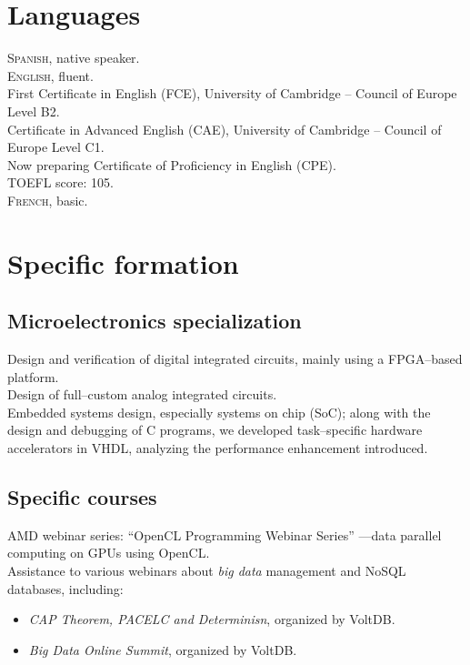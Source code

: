 \documentclass[11pt, a4paper]{article}
\newcommand{\years}[1]{\marginnote{\scriptsize #1}}
\begin{document}
\section*{Languages} %
\noindent
\textsc{Spanish}, native speaker.\\

\textsc{English}, fluent.\\
First Certificate in English (FCE), University of Cambridge -- Council of Europe Level B2.\\
Certificate in Advanced English (CAE), University of Cambridge -- Council of Europe Level C1.\\
Now preparing Certificate of Proficiency in English (CPE).\\
TOEFL score: 105.\\

\textsc{French}, basic.


\section*{Specific formation} %
\subsection*{Microelectronics specialization}
\noindent
\years{2008--2010}Design and verification of digital integrated circuits, mainly using a FPGA--based platform.\\
Design of full--custom analog integrated circuits.\\
Embedded systems design, especially systems on chip (SoC); along with the design and debugging of C programs, we developed task--specific hardware accelerators in VHDL, analyzing the performance enhancement introduced.

\subsection*{Specific courses}
\noindent
\years{2010}AMD webinar series: ``OpenCL Programming Webinar Series'' ---data parallel computing on GPUs using OpenCL.\\
\years{2011}Assistance to various webinars about \textit{big data} management and NoSQL databases, including:
\begin{itemize}
	\item  \emph{CAP Theorem, PACELC and Determinisn}, organized by VoltDB.
	\item  \emph{Big Data Online Summit}, organized by VoltDB.
\end{itemize}
\end{document}
